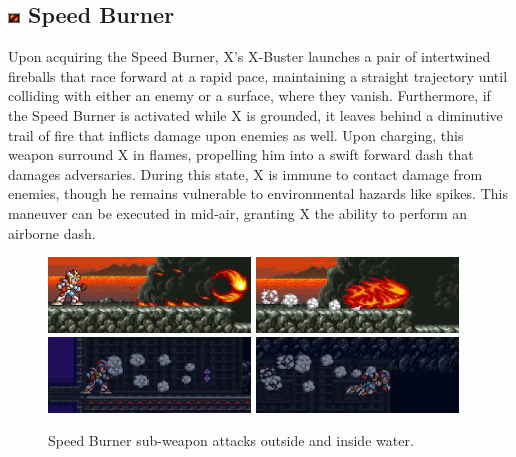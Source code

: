 \subsection{\includegraphics[width=12px, height=10px]{figures/X2/weapons/S_burner.png} Speed Burner}\label{Speed_burner}
Upon acquiring the Speed Burner, X's X-Buster launches a pair of intertwined fireballs that race forward at a rapid pace, maintaining a straight trajectory until colliding with either an enemy or a surface, where they vanish. Furthermore, if the Speed Burner is activated while X is grounded, it leaves behind a diminutive trail of fire that inflicts damage upon enemies as well. Upon charging, this weapon surround X in flames, propelling him into a swift forward dash that damages adversaries. During this state, X is immune to contact damage from enemies, though he remains vulnerable to environmental hazards like spikes. This maneuver can be executed in mid-air, granting X the ability to perform an airborne dash.

\begin{figure}[htp]
	\centering
		\centering
		\includegraphics[height=2cm]{figures/X2/weapons/S_burner_1.png}	
		\includegraphics[height=2cm]{figures/X2/weapons/S_burner_2.png}\vspace{2pt}\\	
		\includegraphics[height=2cm]{figures/X2/weapons/S_burner_3.png}	
		\includegraphics[height=2cm]{figures/X2/weapons/S_burner_4.png}	
	\caption{Speed Burner sub-weapon attacks outside and inside water.}
\end{figure}

